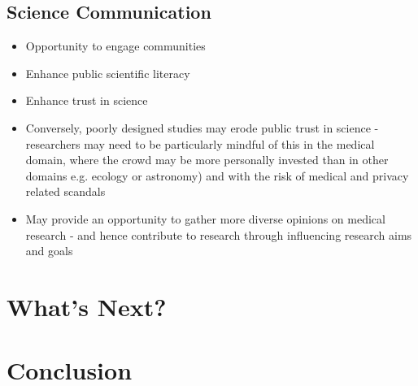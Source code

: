 \documentclass[10pt,twocolumn,letterpaper]{article}
\begin{document}
\subsection{Science Communication}
\begin{itemize}
    \item   Opportunity to engage communities
    \item   Enhance public scientific literacy
    \item   Enhance trust in science 
    \item   Conversely, poorly designed studies may erode public trust in science - researchers may need to be particularly mindful of this in the medical domain, where the crowd may be more personally invested than in other domains e.g. ecology or astronomy) and with the risk of medical and privacy related scandals
    \item   May provide an opportunity to gather more diverse opinions on medical research - and hence contribute to research through influencing research aims and goals 
\end{itemize}

\section{What's Next?}

\section{Conclusion}


{\small


}
\end{document}
